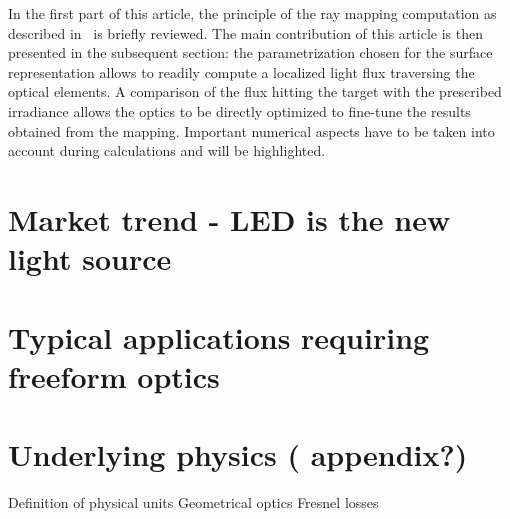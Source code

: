 In the first part of this article, the principle of the ray mapping
computation as described in~\cite{Baeuerle2012} is briefly reviewed.
The main contribution of this article is then presented in the
subsequent section: the parametrization chosen for the surface
representation allows to readily compute a localized light flux
traversing the optical elements. A comparison of the flux hitting the
target with the prescribed irradiance allows the optics to be directly
optimized to fine-tune the results obtained from the mapping.
Important numerical aspects have to be taken into account during
calculations and will be highlighted.

\section{Market trend - LED is the new light source}

\section{Typical applications requiring freeform optics}

\section{Underlying physics ( appendix?)}

Definition of physical units
Geometrical optics
Fresnel losses
